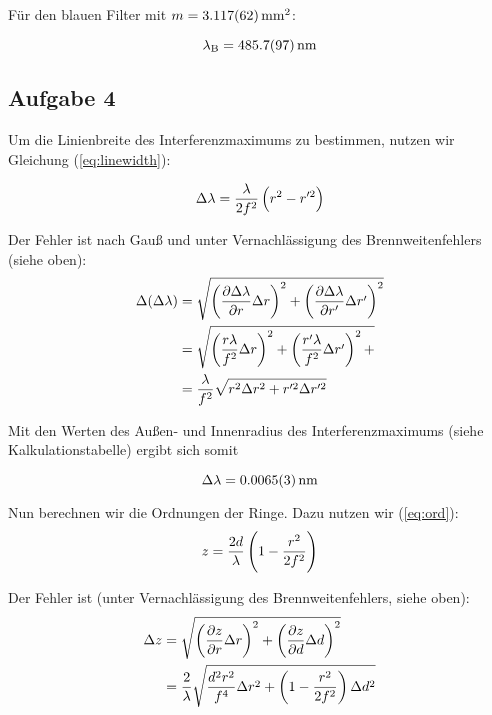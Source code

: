 \documentclass[a4paper,german,12pt,smallheadings]{scrartcl}
\begin{document}
Für den blauen Filter mit $m = \num{3.117 \pm 0.062} \operatorname{mm}^2$:

\begin{equation}
  \lambda_\text{B} = \num{485.7+-9.7} \operatorname{nm}
\end{equation}

\subsection{Aufgabe 4}
Um die Linienbreite des Interferenzmaximums zu bestimmen, nutzen wir Gleichung
(\ref{eq:linewidth}):

\begin{equation}
  \Delta \lambda = \frac{\lambda}{2f^2} \del{r^2 - r'^2}
\end{equation}

Der Fehler ist nach Gauß und unter Vernachlässigung des Brennweitenfehlers
(siehe oben):
\begin{align}
  \Delta(\Delta \lambda) &= \sqrt{
    \del{\frac{\partial \Delta \lambda}{\partial r} \Delta r}^2 +
    \del{\frac{\partial \Delta \lambda}{\partial r'} \Delta r'}^2
  } \\
  &= \sqrt{
    \del{\frac{r \lambda}{f^2} \Delta r}^2 +
    \del{\frac{r' \lambda}{f^2} \Delta r'}^2 +
  } \\
  &= \frac{\lambda}{f^2} \sqrt{
    r^2 \Delta r^2 + r'^2 \Delta r'^2
  }
\end{align}

Mit den Werten des Außen- und Innenradius des Interferenzmaximums (siehe
Kalkulationstabelle) ergibt sich somit

\begin{equation}
  \Delta \lambda = \num{0.0065\pm0.0003} \operatorname{nm}
\end{equation}

Nun berechnen wir die Ordnungen der Ringe. Dazu nutzen wir (\ref{eq:ord}):
\begin{equation}
  z = \frac{2d}{\lambda} \del{1 - \frac{r^2}{2f^2}}
\end{equation}

Der Fehler ist (unter Vernachlässigung des Brennweitenfehlers, siehe oben):
\begin{align}
  \Delta z &= \sqrt{
    \del{\frac{\partial z}{\partial r} \Delta r}^2 +
    \del{\frac{\partial z}{\partial d} \Delta d}^2
  } \\
  &= \frac{2}{\lambda} \sqrt{
    \frac{d^2 r^2}{f^4} \Delta r^2 + \del{1 - \frac{r^2}{2f^2}} \Delta d^2
  }
\end{align}
\end{document}

